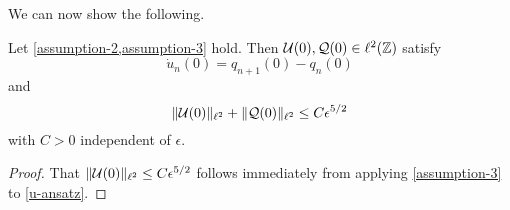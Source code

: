 We can now show the following.
\begin{lem}\label{initial-conditions-lem}
	Let \cref{assumption-2,assumption-3} hold. Then \(\mathcal{U}(0),\mathcal{Q}(0) \in \ell^2(\mathbb{Z})\) satisfy
	\begin{equation}\label{diff-eqn}
		\dot u_n(0) = q_{n+1}(0) - q_n(0)
	\end{equation}
	and 
	\begin{equation}\label{initial-condition-ineq}
		\| \mathcal{U}(0) \|_{\ell^2} + \|\mathcal{Q}(0)\|_{\ell^2} \leq C \epsilon^{5/2}
	\end{equation}
	with \(C>0\) independent of \(\epsilon\).
\end{lem}

\begin{proof}
	That \(\|\mathcal{U}(0)\|_{\ell^2}\leq C \epsilon^{5/2}\) follows immediately from applying \cref{assumption-3} to \cref{u-ansatz}.
	

\end{proof}
